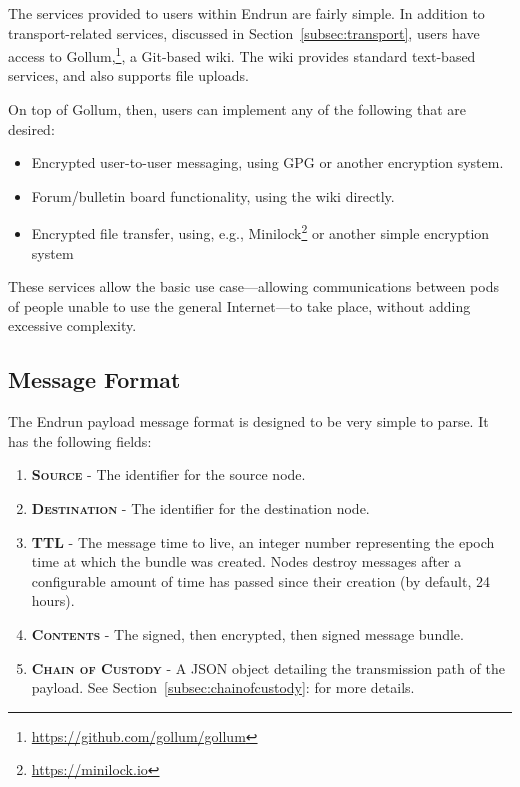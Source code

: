 \documentclass[12pt]{article}
\begin{document}
  The services provided to users within Endrun are fairly simple. In addition to transport-related services, discussed in Section~\ref{subsec:transport}, users have access to Gollum,\footnote{\url{https://github.com/gollum/gollum}}, a Git-based wiki. The wiki provides standard text-based services, and also supports file uploads.
  
  On top of Gollum, then, users can implement any of the following that are desired:
  \begin{itemize}
    \item Encrypted user-to-user messaging, using GPG or another encryption system.
    \item Forum/bulletin board functionality, using the wiki directly.
    \item Encrypted file transfer, using, e.g., Minilock\footnote{\url{https://minilock.io}} or another simple encryption system
  \end{itemize}
  
  These services allow the basic use case---allowing communications between pods of people unable to use the general Internet---to take place, without adding excessive complexity.
  
  \subsection{Message Format}
  
  The Endrun payload message format is designed to be very simple to parse. It has the following fields:
  
  \begin{enumerate}
    \item \textbf{\textsc{Source}} - The identifier for the source node.
    \item \textbf{\textsc{Destination}} - The identifier for the destination node.
    \item \textbf{\textsc{TTL}} - The message time to live, an integer number representing the epoch time at which the bundle was created. Nodes destroy messages after a configurable amount of time has passed since their creation (by default, 24 hours).
    \item \textbf{\textsc{Contents}} - The signed, then encrypted, then signed message bundle.
    \item \textbf{\textsc{Chain of Custody}} - A JSON object detailing the transmission path of the payload. See Section~\ref{subsec:chainofcustody}: for more details.

    \end{enumerate}
    
\end{document}
